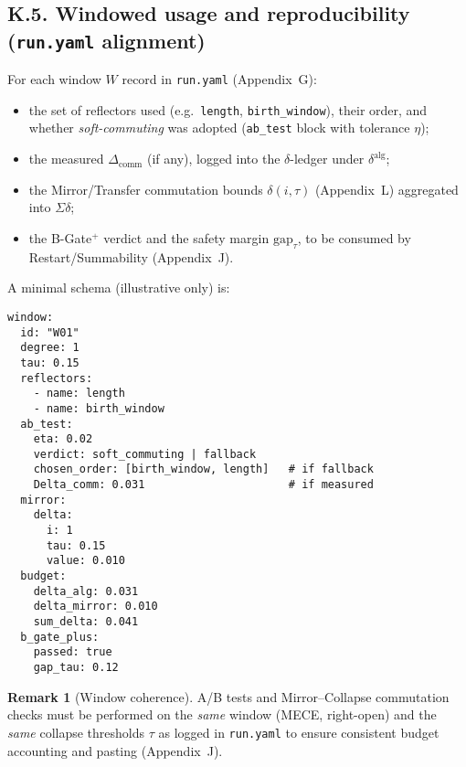 \documentclass[11pt]{article}
\numberwithin{equation}{section}
\theoremstyle{plain}
\theoremstyle{definition}
\theoremstyle{remark}
\DeclareRobustCommand{\hyp}{\nobreakdash-}
\theoremstyle{plain}
\theoremstyle{definition}
\numberwithin{equation}{section}
\theoremstyle{definition}
\newtheorem{remark}[theorem]{Remark}
\numberwithin{equation}{section}
\theoremstyle{plain}
\theoremstyle{definition}
\theoremstyle{remark}
\begin{document}
\subsection*{K.5. Windowed usage and reproducibility (\texttt{run.yaml} alignment)}
For each window \(W\) record in \texttt{run.yaml} (Appendix~G):
\begin{itemize}\itemsep0.2em
  \item the set of reflectors used (e.g.\ \texttt{length}, \texttt{birth\_window}), their order, and whether \emph{soft\hyp commuting} was adopted (\texttt{ab\_test} block with tolerance \(\eta\));
  \item the measured \(\Delta_{\mathrm{comm}}\) (if any), logged into the \(\delta\)\hyp ledger under \(\delta^{\mathrm{alg}}\);
  \item the Mirror/Transfer commutation bounds \(\delta(i,\tau)\) (Appendix~L) aggregated into \(\Sigma\delta\);
  \item the B\hyp Gate\(^{+}\) verdict and the safety margin \(\mathrm{gap}_\tau\), to be consumed by Restart/Summability (Appendix~J).
\end{itemize}

\noindent
A minimal schema (illustrative only) is:
\begin{verbatim}
window:
  id: "W01"
  degree: 1
  tau: 0.15
  reflectors:
    - name: length
    - name: birth_window
  ab_test:
    eta: 0.02
    verdict: soft_commuting | fallback
    chosen_order: [birth_window, length]   # if fallback
    Delta_comm: 0.031                      # if measured
  mirror:
    delta:
      i: 1
      tau: 0.15
      value: 0.010
  budget:
    delta_alg: 0.031
    delta_mirror: 0.010
    sum_delta: 0.041
  b_gate_plus:
    passed: true
    gap_tau: 0.12
\end{verbatim}

\begin{remark}[Window coherence]\label{K:rk:window-coherence}
A/B tests and Mirror–Collapse commutation checks must be performed on the \emph{same} window (MECE, right\hyp open) and the \emph{same} collapse thresholds \(\tau\) as logged in \texttt{run.yaml} to ensure consistent budget accounting and pasting (Appendix~J).
\end{remark}

\end{document}
